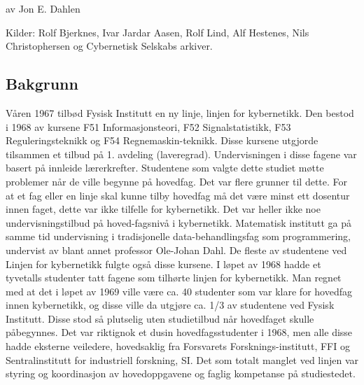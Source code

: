 \documentclass[../main.tex]{subfiles}
\begin{document}
av Jon E. Dahlen

Kilder: Rolf Bjerknes, Ivar Jardar Aasen, Rolf Lind, Alf Hestenes, Nils Christophersen og Cybernetisk Selskabs arkiver.

\subsection{Bakgrunn}
Våren 1967 tilbød Fysisk Institutt en ny linje, linjen for kybernetikk. Den bestod i 1968 av kursene F51 Informasjonsteori, F52 Signalstatistikk, F53 Reguleringsteknikk og F54 Regnemaskin-teknikk. Disse kursene utgjorde tilsammen et tilbud på 1. avdeling (laveregrad). Undervisningen i disse fagene var basert på innleide lærerkrefter. Studentene som valgte dette studiet møtte problemer når de ville begynne på hovedfag. Det var flere grunner til dette. For at et fag eller en linje skal kunne tilby hovedfag må det være minst ett dosentur innen faget, dette var ikke tilfelle for kybernetikk. Det var heller ikke noe undervisningstilbud på hoved-fagsnivå i kybernetikk. Matematisk institutt ga på samme tid undervisning i tradisjonelle data-behandlingsfag som programmering, undervist av blant annet professor Ole-Johan Dahl. De fleste av studentene ved Linjen for kybernetikk fulgte også disse kursene. I løpet av 1968 hadde et tyvetalls studenter tatt fagene som tilhørte linjen for kybernetikk. Man regnet med at det i løpet av 1969 ville være ca. 40 studenter som var klare for hovedfag innen kybernetikk, og disse ville da utgjøre ca. 1/3 av studentene ved Fysisk Institutt. Disse stod så plutselig uten studietilbud når hovedfaget skulle påbegynnes. Det var riktignok et dusin hovedfagsstudenter i 1968, men alle disse hadde eksterne veiledere, hovedsaklig fra Forsvarets Forsknings-institutt, FFI og Sentralinstitutt for industriell forskning, SI. Det som totalt manglet ved linjen var styring og koordinasjon av hovedoppgavene og faglig kompetanse på studiestedet.
\end{document}
